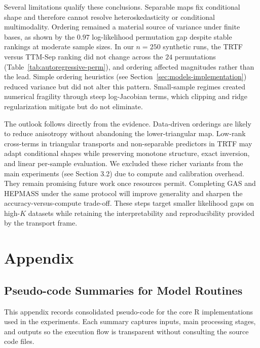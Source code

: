 \documentclass[11pt,a4paper,twoside]{book}\usepackage[]{graphicx}\usepackage[]{xcolor}
\begin{document}
Several limitations qualify these conclusions. Separable maps fix conditional shape and therefore cannot resolve heteroskedasticity or conditional multimodality. Ordering remained a material source of variance under finite bases, as shown by the $0.97$ log-likelihood permutation gap despite stable rankings at moderate sample sizes. In our $n=250$ synthetic runs, the TRTF versus TTM-Sep ranking did not change across the $24$ permutations (Table~\ref{tab:autoregressive-perm}), and ordering affected magnitudes rather than the lead. Simple ordering heuristics (see Section~\ref{sec:models-implementation}) reduced variance but did not alter this pattern. Small-sample regimes created numerical fragility through steep log-Jacobian terms, which clipping and ridge regularization mitigate but do not eliminate. 

The outlook follows directly from the evidence. Data-driven orderings are likely to reduce anisotropy without abandoning the lower-triangular map. Low-rank cross-terms in triangular transports and non-separable predictors in TRTF may adapt conditional shapes while preserving monotone structure, exact inversion, and linear per-sample evaluation. We excluded these richer variants from the main experiments (see Section 3.2) due to compute and calibration overhead. They remain promising future work once resources permit. Completing GAS and HEPMASS under the same protocol will improve generality and sharpen the accuracy-versus-compute trade-off. These steps target smaller likelihood gaps on high-$K$ datasets while retaining the interpretability and reproducibility provided by the transport frame.





\appendix




\chapter{Appendix}\label{ch:appendix}

\section{Pseudo-code Summaries for Model Routines}

This appendix records consolidated pseudo-code for the core R implementations used in the experiments. Each summary captures inputs, main processing stages, and outputs so the execution flow is transparent without consulting the source code files.
\end{document}
